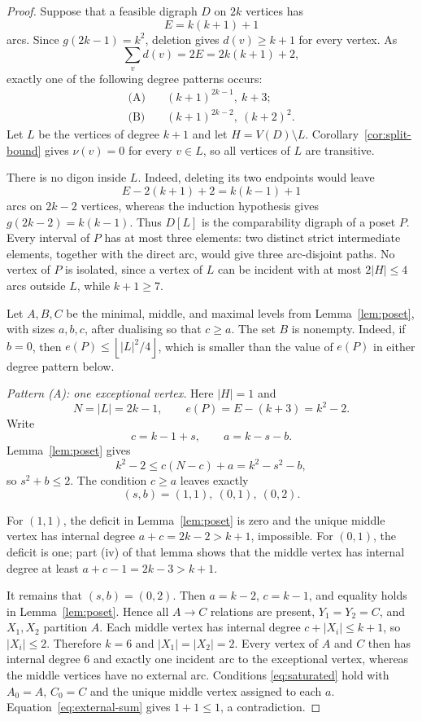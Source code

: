 \documentclass[11pt]{amsart}
\theoremstyle{definition}
\newcommand{\floor}[1]{\left\lfloor #1\right\rfloor}
\begin{document}
\begin{proof}
Suppose that a feasible digraph $D$ on $2k$ vertices has
\[
 E=k(k+1)+1
\]
arcs.  Since $g(2k-1)=k^2$, deletion gives $d(v)\ge k+1$ for every
vertex.  As
\[
 \sum_v d(v)=2E=2k(k+1)+2,
\]
exactly one of the following degree patterns occurs:
\begin{align*}
\text{(A)}&\quad (k+1)^{2k-1},\ k+3;\\
\text{(B)}&\quad (k+1)^{2k-2},\ (k+2)^2.
\end{align*}
Let $L$ be the vertices of degree $k+1$ and let $H=V(D)\setminus L$.
Corollary~\ref{cor:split-bound} gives $\nu(v)=0$ for every $v\in L$, so
all vertices of $L$ are transitive.

There is no digon inside $L$.  Indeed, deleting its two endpoints would
leave
\[
 E-2(k+1)+2=k(k-1)+1
\]
arcs on $2k-2$ vertices, whereas the induction hypothesis gives
$g(2k-2)=k(k-1)$.  Thus $D[L]$ is the comparability digraph of a poset
$P$.  Every interval of $P$ has at most three elements: two distinct
strict intermediate elements, together with the direct arc, would give
three arc-disjoint paths.  No vertex of $P$ is isolated, since a vertex of
$L$ can be incident with at most $2|H|\le4$ arcs outside $L$, while
$k+1\ge7$.

Let $A,B,C$ be the minimal, middle, and maximal levels from
Lemma~\ref{lem:poset}, with sizes $a,b,c$, after dualising so that $c\ge a$.
The set $B$ is nonempty.  Indeed, if $b=0$, then
$e(P)\le\floor{|L|^2/4}$, which is smaller than the value of $e(P)$ in
either degree pattern below.

\smallskip
\noindent\emph{Pattern (A): one exceptional vertex.}
Here $|H|=1$ and
\[
 N=|L|=2k-1,
 \qquad e(P)=E-(k+3)=k^2-2.
\]
Write
\[
 c=k-1+s,
 \qquad a=k-s-b.
\]
Lemma~\ref{lem:poset} gives
\[
 k^2-2\le c(N-c)+a=k^2-s^2-b,
\]
so $s^2+b\le2$.  The condition $c\ge a$ leaves exactly
\[
 (s,b)=(1,1),\ (0,1),\ (0,2).
\]

For $(1,1)$, the deficit in Lemma~\ref{lem:poset} is zero and the unique
middle vertex has internal degree $a+c=2k-2>k+1$, impossible.  For
$(0,1)$, the deficit is one; part (iv) of that lemma shows that the middle
vertex has internal degree at least $a+c-1=2k-3>k+1$.

It remains that $(s,b)=(0,2)$.  Then
$a=k-2$, $c=k-1$, and equality holds in
Lemma~\ref{lem:poset}.  Hence all $A\to C$ relations are present,
$Y_1=Y_2=C$, and $X_1,X_2$ partition $A$.  Each middle vertex has internal
degree $c+|X_i|\le k+1$, so $|X_i|\le2$.  Therefore $k=6$ and
$|X_1|=|X_2|=2$.  Every vertex of $A$ and $C$ then has internal degree
$6$ and exactly one incident arc to the exceptional vertex, whereas the
middle vertices have no external arc.  Conditions
\eqref{eq:saturated} hold with $A_0=A$, $C_0=C$ and the unique middle
vertex assigned to each $a$.  Equation~\eqref{eq:external-sum} gives
$1+1\le1$, a contradiction.


\end{proof}
\end{document}
